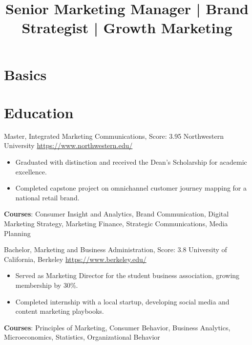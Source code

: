 \documentclass[a4paper, serif, 10pt]{moderncv}
\title{Senior Marketing Manager | Brand Strategist | Growth Marketing}
\begin{document}
\maketitle

\section{Basics}

\section{Education}

        {Master, Integrated Marketing Communications, Score: 3.95}
        {Northwestern University}
        {\url{https://www.northwestern.edu/}}
        {}
        {\begin{itemize}
\item Graduated with distinction and received the Dean's Scholarship for academic excellence.
\item Completed capstone project on omnichannel customer journey mapping for a national retail brand.
\end{itemize}
\textbf{Courses}: Consumer Insight and Analytics, Brand Communication, Digital Marketing Strategy, Marketing Finance, Strategic Communications, Media Planning}

        {Bachelor, Marketing and Business Administration, Score: 3.8}
        {University of California, Berkeley}
        {\url{https://www.berkeley.edu/}}
        {}
        {\begin{itemize}
\item Served as Marketing Director for the student business association, growing membership by 30\%.
\item Completed internship with a local startup, developing social media and content marketing playbooks.
\end{itemize}
\textbf{Courses}: Principles of Marketing, Consumer Behavior, Business Analytics, Microeconomics, Statistics, Organizational Behavior}
\end{document}
